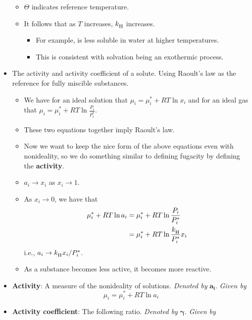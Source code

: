 \documentclass[../notes.tex]{subfiles}
\begin{document}
\begin{itemize}
    \begin{itemize}
        \item $\Theta$ indicates reference temperature.
        \item It follows that as $T$ increases, ${k_\text{H}^{}}$ increases.
        \begin{itemize}
            \item For example,  is less soluble in water at higher temperatures.
            \item This is consistent with solvation being an exothermic process.
        \end{itemize}
    \end{itemize}
    \item The activity and activity coefficient of a solute. Using Raoult's law as the reference for fully miscible substances.
    \begin{itemize}
        \item We have for an ideal solution that $\mu_i=\mu_i^*+RT\ln x_i$ and for an ideal gas that $\mu_i=\mu_i^*+RT\ln\frac{P_i}{P_i^*}$.
        \item These two equations together imply Raoult's law.
        \item Now we want to keep the nice form of the above equations even with nonideality, so we do something similar to defining fugacity by defining the \textbf{activity}.
        \item $a_i\to x_i$ as $x_i\to 1$.
        \item As $x_i\to 0$, we have that
        \begin{align*}
            \mu_i^*+RT\ln a_i &= \mu_i^*+RT\ln\frac{P_i}{P_i^*}\\
            &= \mu_i^*+RT\ln\frac{{k_\text{H}^{}}}{P_i^*}x_i
        \end{align*}
        i.e., $a_i\to {k_\text{H}^{}} x_i/P_i^*$.
        \item As a substance becomes less active, it becomes more reactive.
    \end{itemize}
    \item \textbf{Activity}: A measure of the nonideality of solutions. \emph{Denoted by} $\bm{a_i}$. \emph{Given by}
    \begin{equation*}
        \mu_i = \mu_i^*+RT\ln a_i
    \end{equation*}
    \item \textbf{Activity coefficient}: The following ratio. \emph{Denoted by} $\bm{\gamma}$. \emph{Given by}
    \begin{equation*}

\end{equation*}
\end{itemize}
\end{document}
